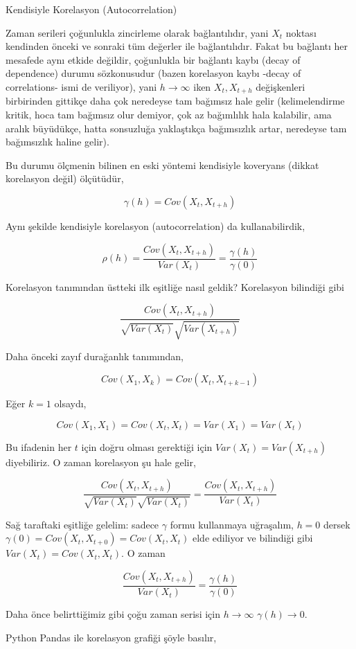 \documentclass[12pt,fleqn]{article}\usepackage{../../common}
\begin{document}
Kendisiyle Korelasyon (Autocorrelation) 

Zaman serileri çoğunlukla zincirleme olarak bağlantılıdır, yani $X_t$ noktası
kendinden önceki ve sonraki tüm değerler ile bağlantılıdır. Fakat bu bağlantı
her mesafede aynı etkide değildir, çoğunlukla bir bağlantı kaybı (decay of
dependence) durumu sözkonusudur (bazen korelasyon kaybı -decay of correlations-
ismi de veriliyor), yani $h \to \infty$ iken $X_t,X_{t+h}$ değişkenleri
birbirinden gittikçe daha çok neredeyse tam bağımsız hale gelir (kelimelendirme
kritik, hoca tam bağımsız olur demiyor, çok az bağımlılık hala kalabilir, ama
aralık büyüdükçe, hatta sonsuzluğa yaklaştıkça bağımsızlık artar, neredeyse tam
bağımsızlık haline gelir).

Bu durumu ölçmenin bilinen en eski yöntemi kendisiyle koveryans (dikkat
korelasyon değil) ölçütüdür,

$$ \gamma(h) = Cov(X_t,X_{t+h}) $$

Aynı şekilde kendisiyle korelasyon (autocorrelation) da kullanabilirdik, 

$$ 
\rho(h) = \frac{Cov(X_t,X_{t+h}) }{Var(X_t) } = \frac{\gamma(h)}{\gamma(0)}
$$

Korelasyon tanımından üstteki ilk eşitliğe nasıl geldik? Korelasyon bilindiği
gibi

$$ \frac{Cov(X_t,X_{t+h}) }{\sqrt{Var(X_t)}\sqrt{Var(X_{t+h})} } $$

Daha önceki zayıf durağanlık tanımından,

$$ Cov(X_1,X_k) = Cov(X_t,X_{t+k-1}) $$

Eğer $k=1$ olsaydı, 

$$ Cov(X_1,X_1) = Cov(X_t,X_t) = Var(X_1) = Var(X_t)$$

Bu ifadenin her $t$ için doğru olması gerektiği için $Var(X_t) = Var(X_{t+h})$
diyebiliriz. O zaman korelasyon şu hale gelir,

$$
\frac{Cov(X_t,X_{t+h}) }{\sqrt{Var(X_t)}\sqrt{Var(X_t)} }  =
\frac{Cov(X_t,X_{t+h}) }{Var(X_t)} 
$$

Sağ taraftaki eşitliğe gelelim: sadece $\gamma$ formu kullanmaya uğraşalım,
$h=0$ dersek $\gamma(0) = Cov(X_t,X_{t+0}) = Cov(X_t,X_t)$ elde ediliyor ve
bilindiği gibi $Var(X_t)=Cov(X_t,X_t)$. O zaman

$$ \frac{Cov(X_t,X_{t+h}) }{Var(X_t)} = \frac{\gamma(h)}{\gamma(0)} $$

Daha önce belirttiğimiz gibi çoğu zaman serisi için $h \to \infty$
$\gamma(h) \to 0$. 

Python Pandas ile korelasyon grafiği şöyle basılır,
\end{document}
